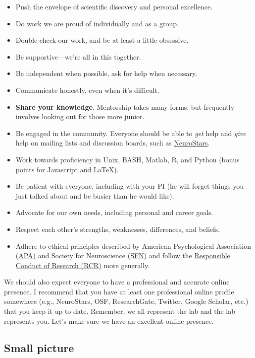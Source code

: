 \documentclass[letterpaper,11pt,oneside]{memoir}
\begin{document}
\begin{itemize}
\item Push the envelope of scientific discovery and personal excellence. 
\item Do work we are proud of individually and as a group.
\item Double-check our work, and be at least a little obsessive.
\item Be supportive---we're all in this together.
\item Be independent when possible, ask for help when necessary.
\item Communicate honestly, even when it's difficult.
\item \textbf{Share your knowledge}. Mentorship takes many forms, but frequently involves looking out for those more junior.
\item Be engaged in the community. Everyone should be able to \textit{get} help and \textit{give} help on mailing lists and discussion boards, such as \href{https://neurostars.org}{NeuroStars}.
\item Work towards proficiency in Unix, BASH, Matlab, R, and Python (bonus points for Javascript and \LaTeX).
\item Be patient with everyone, including with your PI (he will forget things you just talked about and be busier than he would like).
\item Advocate for our own needs, including personal and career goals.
\item Respect each other's strengths, weaknesses, differences, and beliefs.
\item Adhere to ethical principles described by American Psychological Association \href{https://www.apa.org/ethics/code/}{(APA)} and Society for Neuroscience \href{https://web.sfn.org/sfn/member-center/professional-conduct/sfn-ethics-policy}{(SFN)} and follow the \href{https://ori.hhs.gov/ori-introduction-responsible-conduct-research}{Responsible Conduct of Research (RCR)} more generally. 
\end{itemize}

We should also expect everyone to have a professional and accurate online presence. I recommend that you have at least one professional online profile somewhere (e.g., NeuroStars, OSF, ResearchGate, Twitter, Google Scholar, etc.) that you keep it up to date. Remember, we all represent the lab and the lab represents you. Let's make sure we have an excellent online presence.


\subsection{Small picture}
\end{document}
